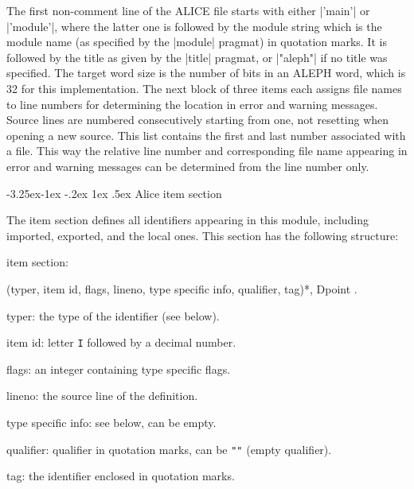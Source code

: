 \documentclass[titlepage]{article}
\makeatletter
\newcommand\A{\textsf{ALEPH}}
\newcommand\I{\textsf{ALICE}}
\newcommand\g[1]{\textsf{#1}}
\newenvironment{grammar}{%
\begin{list}{}{%
\setlength\leftmargin{18pt}%
\setlength\rightmargin{-5pt}%
\setlength\listparindent{20pt}%
\setlength\itemsep{1pt plus0.2ex}%
\setlength\parsep{0pt plus 2pt}%
\setlength\labelsep{-5pt}%
}\sf\mkoptions%
}{\end{list}}
\def\remark#1{{\normalfont #1}}
\renewcommand\subsection{%
\@startsection{subsection}{2}{\z@}%
   {-3.25ex\@plus -1ex \@minus -.2ex}%
   {1ex \@plus .5ex}%
   {\normalfont\normalsize\bfseries}}
\makeatother
\begin{document}
\noindent
The first non-comment line of the \I{} file starts with either \pp|'main'|
or \pp|'module'|, where the latter one is followed by the \g{module string}
which is the module name (as specified by the \pp|module| pragmat) in
quotation marks. It is followed by the title as given by the \pp|title|
pragmat, or \pp|"aleph"| if no title was specified. The target word size is the
number of bits in an \A{} word, which is 32 for this implementation. The
next block of three items each assigns file names to line numbers for
determining the 
location in error and warning messages. Source lines are numbered consecutively
starting from one, not resetting when opening a new source. This list
contains the first and last number associated with a file. This way the
relative line number and corresponding file name appearing in error and
warning messages can be determined from the line number only.

\subsection{Alice item section}\label{alice:item}

The \g{item section} defines all identifiers appearing in this module,
including imported, exported, and the local ones. This section has the
following structure:
\begin{grammar}
\item item section: 

  (typer, item id, flags, lineno, type specific info, qualifier, tag)*, Dpoint .
\item typer: \remark{the type of the identifier (see below)}.
\item item id: \remark{letter {\tt I} followed by a decimal number}.
\item flags: \remark{an integer containing type specific flags}.
\item lineno: \remark{the source line of the definition}.
\item type specific info: \remark{see below, can be empty}.
\item qualifier: \remark{qualifier in quotation marks, can be {\tt""} (empty
qualifier)}.
\item tag: \remark{the identifier enclosed in quotation marks}.
\end{grammar}
\end{document}
